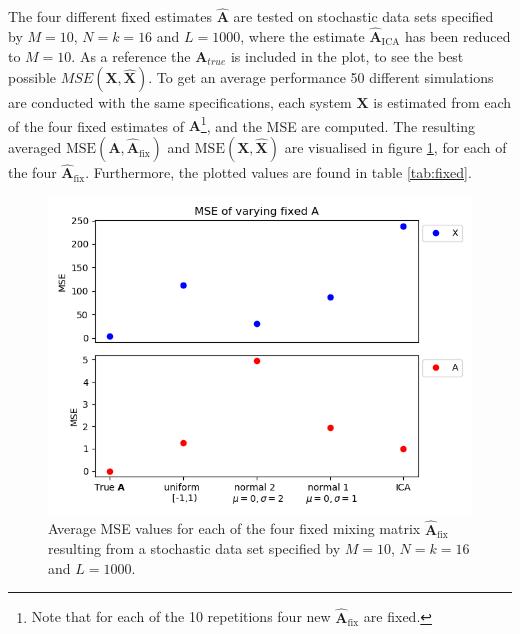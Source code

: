 The four different fixed estimates $\hat{\mathbf{A}}$ are tested on stochastic data sets specified by $M = 10$, $N = k = 16$ and $L = 1000$, where the estimate $\hat{\mathbf{A}}_{\text{ICA}}$ has been reduced to $M = 10$. 
As a reference the $\textbf{A}_{true}$ is included in the plot, to see the best possible $MSE(\textbf{X},\hat{\textbf{X}})$.
To get an average performance 50 different simulations are conducted with the same specifications, each system $\mathbf{X}$ is estimated from each of the four fixed estimates of $\mathbf{A}$\footnote{Note that for each of the 10 repetitions four new $\hat{\mathbf{A}}_{\text{fix}}$ are fixed.}, and the MSE are computed. 
The resulting averaged $\text{MSE}(\mathbf{A}, \hat{\mathbf{A}}_{\text{fix}})$ and $\text{MSE}(\mathbf{X}, \hat{\mathbf{X}})$ are visualised in figure \ref{fig:vary_A}, for each of the four $\hat{\mathbf{A}}_{\text{fix}}$. 
Furthermore, the plotted values are found in table \ref{tab:fixed}.
\begin{figure}[H]
\centering
\includegraphics[scale=0.5]{figures/ch_6/A_fix1.png}
\caption{Average MSE values for each of the four fixed mixing matrix $\hat{\mathbf{A}}_{\text{fix}}$ resulting from a stochastic data set specified by $M=10$, $N=k=16$ and $L=1000$.}
\label{fig:vary_A}
\end{figure}
\noindent

